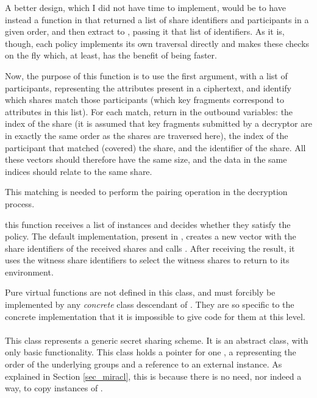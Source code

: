 \documentclass{article}
\begin{document}
\begin{description}
A better design, which I did not have time to implement, would be to have instead a function in \cAP that returned a list of share identifiers and participants in a given order, and then extract  to \cKPABE, passing it that list of identifiers. As it is, though, each policy implements its own traversal directly and makes these checks on the fly which, at least, has the benefit of being faster.

Now, the purpose of this function is to use the first argument, with a list of participants, representing the attributes present in a ciphertext, and identify which shares match those participants (which key fragments correspond to attributes in this list). For each match, return in the outbound variables: the index of the share (it is assumed that key fragments submitted by a decryptor are in exactly the same order as the shares are traversed here), the index of the participant that matched (covered) the share, and the identifier of the share. All these vectors should therefore have the same size, and the data in the same indices should relate to the same share. 

This matching is needed to perform the pairing operation in the decryption process.

\item[\code{evaluate()}] this function receives a list of \cST instances and decides whether they satisfy the policy. The default implementation, present in \fcss, creates a new vector with the share identifiers of the received shares and calls . After receiving the result, it uses the witness share identifiers to select the witness shares to return to its environment.

Pure virtual functions are not defined in this class, and must forcibly be implemented by any \emph{concrete} class descendant of \cAP. They are so specific to the concrete implementation that it is impossible to give code for them at this level.
\end{description}

\paragraph{\cSS}

This class represents a generic secret sharing scheme. It is an abstract class, with only basic functionality. This class holds a pointer for one \cAP, a \cBig representing the order of the underlying groups and a reference to an external \cPFC instance. As explained in Section \ref{sec_miracl}, this is because there is no need, nor indeed a way, to copy instances of \cPFC.
\end{document}
